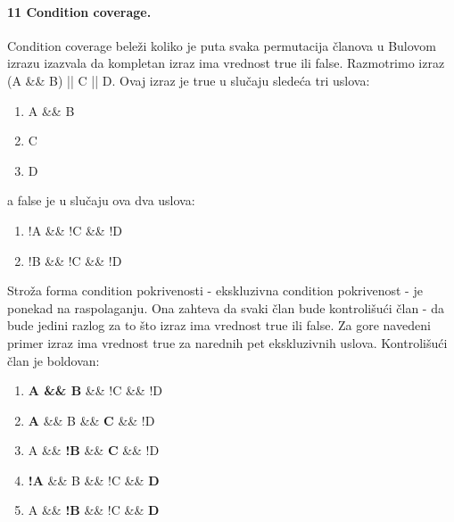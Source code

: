 \documentclass[a4paper, 12pt]{article}
\begin{document}
\paragraph{11 Condition coverage.}
\hfill \break
\indent Condition coverage beleži koliko je puta svaka permutacija članova u Bulovom izrazu izazvala da kompletan izraz ima vrednost true ili false. Razmotrimo izraz (A \&\& B) || C || D. Ovaj izraz je true u slučaju sledeća tri uslova:
\begin{enumerate}
\item A \&\& B
\item C
\item D
\end{enumerate}
a false je u slučaju ova dva uslova:
\begin{enumerate}
\item !A \&\& !C \&\& !D
\item !B \&\& !C \&\& !D
\end{enumerate}
\indent Stroža forma condition pokrivenosti - ekskluzivna condition pokrivenost - je ponekad na raspolaganju. Ona zahteva da svaki član bude kontrolišući član - da bude jedini razlog za to što izraz ima vrednost true ili false. Za gore navedeni primer izraz ima vrednost true za narednih pet ekskluzivnih uslova. Kontrolišući član je boldovan:
\begin{enumerate}
\item \textbf{A \&\& B} \&\& !C \&\& !D
\item \textbf{A} \&\& B \&\& \textbf{C} \&\& !D
\item A \&\& \textbf{!B} \&\& \textbf{C} \&\& !D
\item \textbf{!A} \&\& B \&\& !C \&\& \textbf{D}
\item A \&\& \textbf{!B} \&\& !C \&\& \textbf{D}
\end{enumerate}
\end{document}

